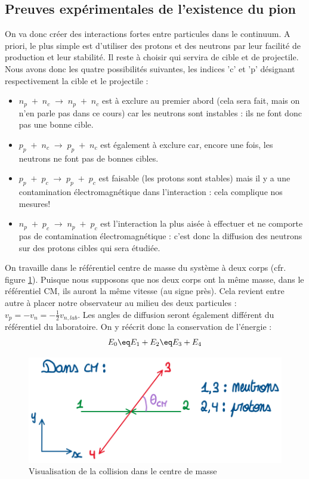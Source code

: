 \subsection{Preuves expérimentales de l'existence du pion}



On va donc créer des interactions fortes entre particules dans le continuum. A priori, le plus simple est d'utiliser des protons et des neutrons par leur facilité de production et leur stabilité. Il reste à choisir qui servira de cible et de projectile. Nous avons donc les quatre possibilités suivantes, les indices 'c' et 'p' désignant respectivement la cible et le projectile :
\begin{itemize}[label=$\bullet$]
    \item $n_p\; +\; n_c\; \longrightarrow\; n_p\;+\; n_c$ est à exclure au premier abord (cela sera fait, mais on n'en parle pas dans ce cours) car les neutrons sont instables : ils ne font donc pas une bonne cible.
    \item $p_p\; +\; n_c\; \longrightarrow\; p_p \;+\; n_c$ est également à exclure car, encore une fois, les neutrons ne font pas de bonnes cibles.
    \item $p_p\; +\; p_c\; \longrightarrow\; p_p \;+\; p_c$ est faisable (les protons sont stables) mais il y a une contamination électromagnétique dans l'interaction : cela complique nos mesures!
    \item $n_p\; +\; p_c\; \longrightarrow\; n_p \;+\; p_c$ est l'interaction la plus aisée à effectuer et ne comporte pas de contamination électromagnétique : c'est donc la diffusion des neutrons sur des protons cibles qui sera étudiée.
\end{itemize}
On travaille dans le référentiel centre de masse du système à deux corps (cfr. figure \ref{collision_np_yukawa}). Puisque nous supposons que nos deux corps ont la même masse, dans le référentiel CM, ils auront la même vitesse (au signe près). Cela revient entre autre à placer notre observateur au milieu des deux particules : $v_p = -v_n = -\frac{1}{2}v_{n,lab}$. Les angles de diffusion seront également différent du référentiel du laboratoire. On y réécrit donc la conservation de l'énergie :
\begin{equation*}
    E_0 \eq E_1 + E_2 \eq E_3 + E_4
\end{equation*}
\begin{figure}[H]
    \centering
    \includegraphics[scale = 0.6]{Images4/collision_CM.png}
    \caption{Visualisation de la collision dans le centre de masse}
    \label{collision_np_yukawa}
\end{figure}
